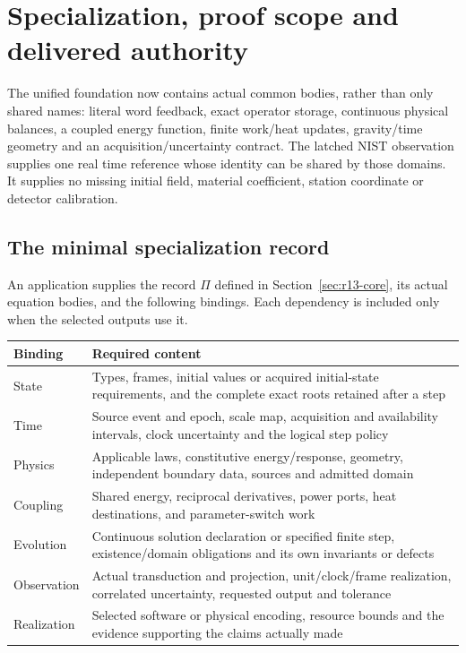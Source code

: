\section{Specialization, proof scope and delivered authority}
\label{sec:r14-completion}
The unified foundation now contains actual common bodies, rather than only
shared names: literal word feedback, exact operator storage, continuous
physical balances, a coupled energy function, finite work/heat updates,
gravity/time geometry and an acquisition/uncertainty contract. The latched
NIST observation supplies one real time reference whose identity can be shared
by those domains. It supplies no missing initial field, material coefficient,
station coordinate or detector calibration.

\subsection{The minimal specialization record}
An application supplies the record $\Pi$ defined in
Section~\ref{sec:r13-core}, its actual equation bodies, and the following
bindings. Each dependency is included only when the selected outputs use it.
\begin{center}\small
\begin{tabularx}{\linewidth}{@{}P{30mm}Y@{}}
\toprule Binding & Required content\\\midrule
State & Types, frames, initial values or acquired initial-state requirements,
and the complete exact roots retained after a step\\
Time & Source event and epoch, scale map, acquisition and availability intervals,
clock uncertainty and the logical step policy\\
Physics & Applicable laws, constitutive energy/response, geometry, independent
boundary data, sources and admitted domain\\
Coupling & Shared energy, reciprocal derivatives, power ports, heat destinations,
and parameter-switch work\\
Evolution & Continuous solution declaration or specified finite step,
existence/domain obligations and its own invariants or defects\\
Observation & Actual transduction and projection, unit/clock/frame realization,
correlated uncertainty, requested output and tolerance\\
Realization & Selected software or physical encoding, resource bounds and
the evidence supporting the claims actually made\\
\bottomrule
\end{tabularx}\end{center}

